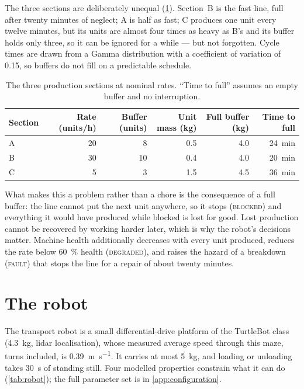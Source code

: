 The three sections are deliberately unequal (\cref{tab:sections}). Section~B is the fast line, full
after twenty minutes of neglect; A is half as fast; C produces one unit every twelve minutes, but
its units are almost four times as heavy as B's and its buffer holds only three, so it can be
ignored for a while --- but not forgotten. Cycle times are drawn from a Gamma distribution with a
coefficient of variation of \num{0.15}, so buffers do not fill on a predictable schedule.

\begin{table}[H]
    \centering
    \caption{The three production sections at nominal rates. ``Time to full'' assumes an empty
             buffer and no interruption.}
    \label{tab:sections}
    \begin{tabular}{lrrrrr}
        \toprule
        Section & Rate (units/h) & Buffer (units) & Unit mass (kg) & Full buffer (kg) & Time to full\\
        \midrule
        A & 20 & 8  & 0.5 & 4.0 & \SI{24}{\minute}\\
        B & 30 & 10 & 0.4 & 4.0 & \SI{20}{\minute}\\
        C & 5  & 3  & 1.5 & 4.5 & \SI{36}{\minute}\\
        \bottomrule
    \end{tabular}
\end{table}

What makes this a problem rather than a chore is the consequence of a full buffer: the line cannot
put the next unit anywhere, so it stops (\textsc{blocked}) and everything it would have produced
while blocked is lost for good. Lost production cannot be recovered by working harder later, which
is why the robot's decisions matter. Machine health additionally decreases with every unit
produced, reduces the rate below \SI{60}{\percent} health (\textsc{degraded}), and raises the
hazard of a breakdown (\textsc{fault}) that stops the line for a repair of about twenty minutes.

\section{The robot}
\label{sec:robot}

The transport robot is a small differential-drive platform of the TurtleBot class
(\SI{4.3}{\kilo\gram}, lidar localisation), whose measured average speed through this maze, turns
included, is \SI{0.39}{\metre\per\second}. It carries at most \SI{5}{\kilo\gram}, and loading or
unloading takes \SI{30}{\second} of standing still. Four modelled properties constrain what it can
do (\cref{tab:robot}); the full parameter set is in \cref{app:configuration}.

